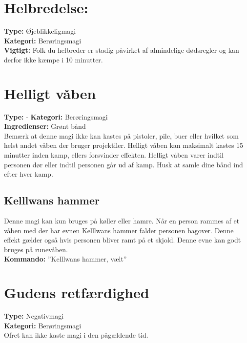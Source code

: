 \section{Helbredelse:}
\textbf{Type:} Øjeblikkeligmagi\\ 
\textbf{Kategori:} Berøringsmagi\\
\textbf{Vigtigt:} Folk du helbreder er stadig påvirket af almindelige dødsregler og kan derfor ikke kæmpe i 10 minutter.

\section{Helligt våben}
\textbf{Type:} -
\textbf{Kategori:} Berøringsmagi\\
\textbf{Ingredienser:} Grønt bånd\\
Bemærk at denne magi ikke kan kastes på pistoler, pile, buer eller hvilket som helst andet våben der bruger projektiler. Helligt våben kan maksimalt kastes 15 minutter inden kamp, ellers forsvinder effekten. Helligt våben varer indtil personen dør eller indtil personen går ud af kamp. Husk at samle
dine bånd ind efter hver kamp.\\

\subsection{Kelllwans hammer}
Denne magi kan kun bruges på køller eller hamre. Når en person rammes af et våben med der har evnen Kelllwans hammer falder personen bagover. Denne effekt gælder også hvis personen bliver ramt på et skjold. Denne evne kan godt bruges på runevåben.\\ 
\textbf{Kommando:} ”Kelllwans hammer, vælt”

\section{Gudens retfærdighed}
\textbf{Type:} Negativmagi\\ 
\textbf{Kategori:} Berøringsmagi\\
Ofret kan ikke kaste magi i den pågældende tid.
